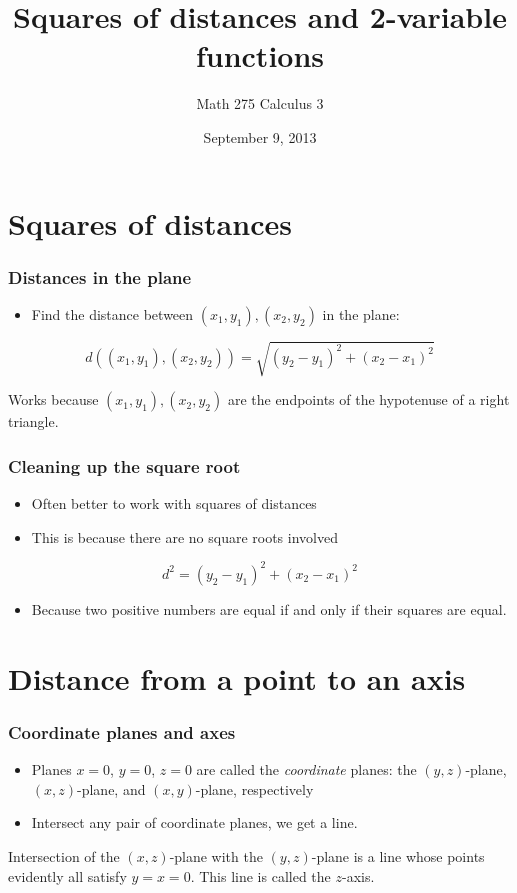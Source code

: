 \documentclass[11pt,ignorenonframetext,aspectratio=169]{beamer}
\title{Squares of distances and 2-variable functions}
\author{Math 275 Calculus 3}
\date{September 9, 2013 }
\begin{document}
\frame{\titlepage}

\section{Squares of distances}

\begin{frame}\frametitle{Distances in the plane}

\begin{itemize}[<+->]

\item
  Find the distance between $(x_1, y_1), (x_2, y_2)$ in the plane:
\end{itemize}

\[ d((x_1, y_1), (x_2, y_2)) = \sqrt{(y_2 - y_1)^2 + (x_2 - x_1)^2} \]

Works because $(x_1, y_1), (x_2, y_2)$ are the endpoints of the
hypotenuse of a right triangle.

\end{frame}

\begin{frame}\frametitle{Cleaning up the square root}

\begin{itemize}[<+->]
\item
  Often better to work with squares of distances
\item
  This is because there are no square roots involved
\end{itemize}

\[ d^2 = (y_2 - y_1)^2 + (x_2 - x_1)^2 \]

\begin{itemize}[<+->]

\item
  Because two positive numbers are equal if and only if their squares
  are equal.
\end{itemize}

\end{frame}

\section{Distance from a point to an axis}

\begin{frame}\frametitle{Coordinate planes and axes}

\begin{itemize}[<+->]
\item
  Planes $x = 0$, $y = 0$, $z = 0$ are called the \emph{coordinate}
  planes: the $(y,z)$-plane, $(x,z)$-plane, and $(x,y)$-plane,
  respectively
\item
  Intersect any pair of coordinate planes, we get a line.
\end{itemize}

Intersection of the $(x,z)$-plane with the $(y,z)$-plane is a line whose
points evidently all satisfy $y = x = 0$. This line is called the
$z$-axis.

\end{frame}
\end{document}
